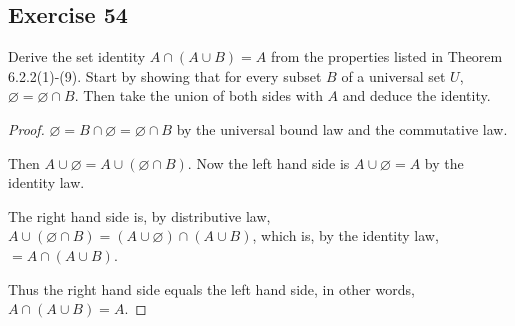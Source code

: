 \documentclass[14pt]{extarticle}
\newcommand{\es}{\varnothing}
\begin{document}
\subsection{Exercise 54}
Derive the set identity \(A \cap (A \cup B) = A\) from the properties listed in Theorem 6.2.2(1)-(9). Start by showing 
that for every subset $B$ of a universal set $U$, \(\es = \es \cap B\). Then take the union of both sides with $A$ 
and deduce the identity.

\begin{proof}
\(\es = B \cap \es = \es \cap B\) by the universal bound law and the commutative law.

Then \(A \cup \es = A \cup (\es \cap B)\). Now the left hand side is \(A \cup \es = A\) by the identity law.

The right hand side is, by distributive law, \(A \cup (\es \cap B) = (A \cup \es) \cap (A \cup B)\), which is, by the
identity law, \(= A \cap (A \cup B)\).

Thus the right hand side equals the left hand side, in other words, \(A \cap (A \cup B) = A\).
\end{proof}
\end{document}
